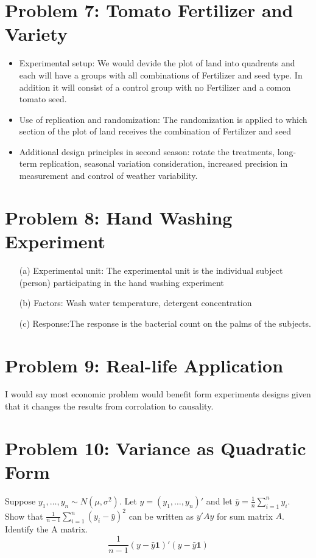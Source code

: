 \documentclass[10pt, oneside]{article}
\begin{document}
\section*{Problem 7: Tomato Fertilizer and Variety}
\begin{itemize}
	\item Experimental setup: We would devide the plot of land into quadrents and each will have a groups with all combinations of Fertilizer and seed type.
	      In addition it will consist of a control group with no Fertilizer and a comon tomato seed.
	\item Use of replication and randomization: The randomization is applied to which section of the plot of land receives the combination of Fertilizer and seed
	\item Additional design principles in second season: rotate the treatments, long-term replication, seasonal variation consideration, increased precision in measurement and control of weather variability.
\end{itemize}

\section*{Problem 8: Hand Washing Experiment}
\begin{itemize}
	\item[(a)] Experimental unit: The experimental unit is the individual subject (person) participating in the hand washing experiment
	\item[(b)] Factors: Wash water temperature, detergent concentration
	\item[(c)] Response:The response is the bacterial count on the palms of the subjects.
\end{itemize}

\section*{Problem 9: Real-life Application}
I would say most economic problem would benefit form experiments designs given that it changes the results from corrolation to causality.

\section*{Problem 10: Variance as Quadratic Form}
Suppose $y_1,\ldots,y_n \sim N(\mu,\sigma^2)$. Let $y = (y_1,\ldots,y_n)'$ and let $\bar{y} = \frac{1}{n}\sum^n_{i=1}y_i$. Show that
$\frac{1}{n-1}\sum^n_{i=1}(y_i - \bar{y})^2$ can be written as $y'Ay$ for sum matrix $A$. Identify the A matrix.
\[
	\frac{1}{n-1}(y - \bar{y}\mathbf{1})'(y - \bar{y}\mathbf{1})
\]
\end{document}
